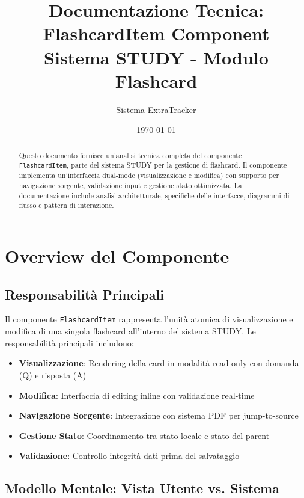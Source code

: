 \documentclass[11pt,a4paper]{article}
\title{
    \textbf{Documentazione Tecnica: FlashcardItem Component} \\
    \large Sistema STUDY - Modulo Flashcard
}
\author{Sistema ExtraTracker}
\date{\today}
\begin{document}
\maketitle

\begin{abstract}
Questo documento fornisce un'analisi tecnica completa del componente \texttt{FlashcardItem}, parte del sistema STUDY per la gestione di flashcard. Il componente implementa un'interfaccia dual-mode (visualizzazione e modifica) con supporto per navigazione sorgente, validazione input e gestione stato ottimizzata. La documentazione include analisi architetturale, specifiche delle interfacce, diagrammi di flusso e pattern di interazione.
\end{abstract}

\tableofcontents
\newpage


\section{Overview del Componente}

\subsection{Responsabilità Principali}

Il componente \texttt{FlashcardItem} rappresenta l'unità atomica di visualizzazione e modifica di una singola flashcard all'interno del sistema STUDY. Le responsabilità principali includono:

\begin{itemize}
    \item \textbf{Visualizzazione}: Rendering della card in modalità read-only con domanda (Q) e risposta (A)
    \item \textbf{Modifica}: Interfaccia di editing inline con validazione real-time
    \item \textbf{Navigazione Sorgente}: Integrazione con sistema PDF per jump-to-source
    \item \textbf{Gestione Stato}: Coordinamento tra stato locale e stato del parent
    \item \textbf{Validazione}: Controllo integrità dati prima del salvataggio
\end{itemize}

\subsection{Modello Mentale: Vista Utente vs. Sistema}
\end{document}
